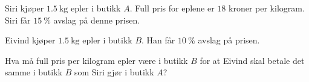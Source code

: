 %



\Oppgave[2] %

Siri kjøper $\SI{1,5}{\kg}$ epler i butikk $A$. Full pris for eplene er $18$
kroner per kilogram.  Siri får $\SI{15}{\percent}$ avslag på denne prisen.
\medskip

Eivind kjøper $\SI{1,5}{\kg}$ epler i butikk $B$. Han får $\SI{10}{\percent}$
avslag på prisen. \medskip

Hva må full pris per kilogram epler være i butikk $B$ for at Eivind skal betale
det samme i butikk $B$ som Siri gjør i butikk $A$?


\Oppgave[4] %

